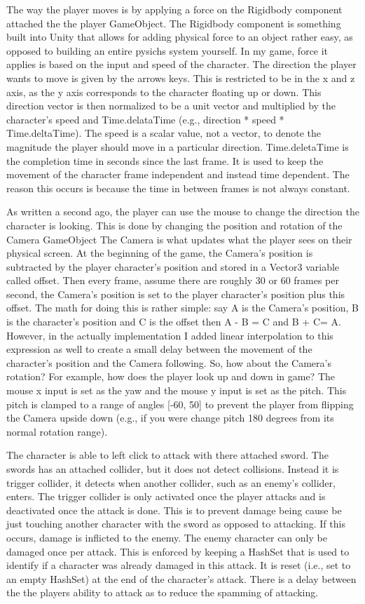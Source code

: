 \documentclass[conference]{IEEEtran}
\begin{document}
The way the player moves is by applying a force on the Rigidbody component attached the the player GameObject.
The Rigidbody component  is something built into Unity that allows for adding physical force  to an object rather easy, as opposed to building an entire pysichs system yourself.
In my game, force it applies is based on the input and speed of the character.
The direction the player wants to move is given by the arrows keys.
This is restricted to be in the x and z axis, as the y axis corresponds to the character floating up or down.
This direction vector is then normalized to be a unit vector and multiplied by the character’s speed and Time.delataTime (e.g., direction * speed * Time.deltaTime). \cite{b2}
The speed is a scalar value, not a vector, to denote the magnitude the player should move in a particular direction.
Time.deletaTime is the completion time in seconds since the last frame.
It is used to keep the movement of the character frame independent and instead time dependent.
The reason this occurs is because the time in between frames is not always constant.

As written a second ago, the player can use the mouse to change the direction the character is looking.
This is done by changing the position and rotation of the Camera GameObject
The Camera is what  updates what the player sees on their physical screen.
At the beginning of the game, the Camera’s position is subtracted by the player character’s position and stored in a Vector3 variable called offset.
Then every frame, assume there are roughly 30 or 60 frames per second, the Camera’s position is set to the player character’s position plus this offset.
The math for doing this is rather simple: say A is the Camera’s position, B is the character’s position and C is the offset then A - B = C and B + C= A.
However, in the actually implementation I added linear interpolation to this expression as well to create a small delay between the movement of the character’s position and the Camera following.
So, how about the Camera’s rotation?
For example, how does the player look up and down in game?
The mouse x input is set as the yaw and the mouse y input is set as the pitch.
This pitch is clamped to a range of angles [-60, 50] to prevent the player from flipping the Camera upside down (e.g., if you were change pitch 180 degrees from its normal rotation range).

The character is able to left click to attack with there attached sword.
The swords has an attached collider, but it does not detect collisions.
Instead it is trigger collider, it detects when another collider, such as an enemy’s collider, enters.
The trigger collider is only activated once the player attacks and is deactivated once the attack is done.
This is to prevent damage being cause be just touching another character with the sword as opposed to attacking.
If this occurs, damage is inflicted to the enemy.
The enemy character can only be damaged once per attack.
This is enforced by keeping a HashSet that is used to identify if a character was already damaged in this attack.
It is reset (i.e., set to an empty HashSet) at the end of the character’s attack.
There is a delay between the the players ability to attack as to reduce the spamming of attacking.
\end{document}
